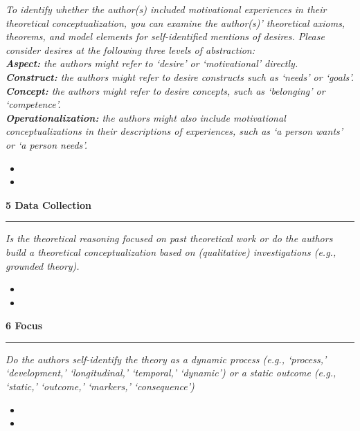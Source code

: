 \documentclass[10pt,a4paper]{protocol}
\newcommand\category[2]{
{\Large\bfseries\color{emphasis} \vspace{0.25em} #1 \hspace{0.5em} #2 \\ [-0.6em] \rule{\textwidth}{0.4pt} \vspace{0.25em}}
}
\begin{document}
\textit{To identify whether the author(s) included motivational experiences in their theoretical conceptualization, you can examine the author(s)' theoretical axioms, theorems, and model elements for self-identified mentions of desires. Please consider desires at the following three levels of abstraction:\\
\textbf{Aspect:} the authors might refer to `desire' or `motivational' directly.\\
\textbf{Construct:} the authors might refer to desire constructs such as `needs' or `goals'.\\
\textbf{Concept:} the authors might refer to desire concepts, such as `belonging' or `competence'.\\
\textbf{Operationalization:} the authors might also include motivational conceptualizations in their descriptions of experiences, such as `a person wants' or `a person needs'.}
\vspace{0.5em}
\begin{itemize}
	\item {}
	\item {}
\end{itemize}
\divider

\clearpage
\vspace*{2em}

\category{5}{Data Collection}

\textit{Is the theoretical reasoning focused on past theoretical work or do the authors build a theoretical conceptualization based on (qualitative) investigations (e.g., grounded theory).}
\vspace{0.5em}
\begin{itemize}
	\item {}
	\item {}
\end{itemize}
\divider

\category{6}{Focus}

\textit{Do the authors self-identify the theory as a dynamic process (e.g., `process,' `development,' `longitudinal,' `temporal,' `dynamic') or a static outcome (e.g., `static,' `outcome,' `markers,' `consequence')}
\vspace{0.5em}
\begin{itemize}
	\item {}
	\item {}
\end{itemize}
\divider
\end{document}

